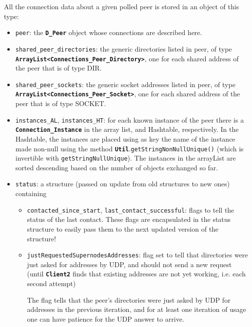 \documentclass{book}
\newcommand{\cls}[1]{{\tt\bf #1}}
\newcommand{\mth}[1]{{\tt #1}}
\newcommand{\mmb}[1]{{\tt #1}}
\begin{document}
All the connection data about a given polled peer is stored in an object of this type:
\begin{itemize}
\item
\mmb{peer}: the \cls{D\_Peer} object whose connections are described here.
\item
\mmb{shared\_peer\_directories}: the generic directories listed in peer, of type \cls{ArrayList<Connections\_Peer\_Directory>}, one for each
shared address of the peer that is of type DIR.
\item
\mmb{shared\_peer\_sockets}: the generic socket addresses listed in peer, of type \cls{ArrayList<Connections\_Peer\_Socket>}, one for each
shared address of the peer that is of type SOCKET.
\item
\mmb{instances\_AL}, \mmb{instances\_HT}: for each known instance of the peer there is a \cls{Connection\_Instance}
in the array list, and Hashtable, respectively. In the Hashtable, the instances are placed using as key the name
of the instance made non-null using the method \cls{Util}.\mth{getStringNonNullUnique()} (which is invertible with \mth{getStringNullUnique}).
The instances in the arrayList are sorted descending based on the number of objects exchanged so far.
\item
\mmb{status}: a structure (passed on update from old structures to new ones)  containing
 \begin{itemize}
 \item
  \mmb{contacted\_since\_start}, \mmb{last\_contact\_successful}: flags to tell the status of the last contact. These flags are encapsulated in the
status structure to easily pass them to the next updated version of the structure!
 \item
 \mmb{justRequestedSupernodesAddresses}: flag set to tell that directories were just asked for addresses by UDP, and should not
 send a new request (until \cls{Client2} finds that existing addresses are not yet working, i.e. each second attempt)

 The flag tells that the peer's directories were just asked by UDP for addresses in the previous iteration, and for at least one iteration of usage one can have patience for the UDP answer to arrive.
 \end{itemize}
\end{itemize}
\end{document}
